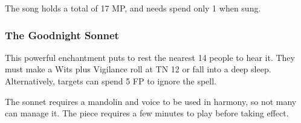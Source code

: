 The song holds a total of 17 MP, and needs spend only 1 when sung.

\subsubsection{The Goodnight Sonnet}
This powerful enchantment puts to rest the nearest 14 people to hear it.  They must make a Wits plus Vigilance roll at TN 12 or fall into a deep sleep.  Alternatively, targets can spend 5 FP to ignore the spell.

The sonnet requires a mandolin and voice to be used in harmony, so not many can manage it.  The piece requires a few minutes to play before taking effect.


